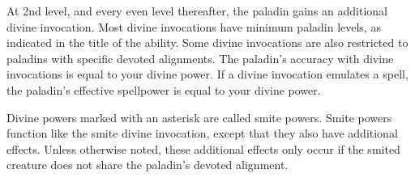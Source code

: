         At 2nd level, and every even level thereafter, the paladin gains an additional divine invocation.
        Most divine invocations have minimum paladin levels, as indicated in the title of the ability.
        Some divine invocations are also restricted to paladins with specific devoted alignments.
        The paladin's accuracy with divine invocations is equal to your divine power.
        If a divine invocation emulates a spell, the paladin's effective spellpower is equal to your divine power.

        Divine powers marked with an asterisk are called smite powers.
        Smite powers function like the smite divine invocation, except that they also have additional effects.
        Unless otherwise noted, these additional effects only occur if the smited creature does not share the paladin's devoted alignment.



